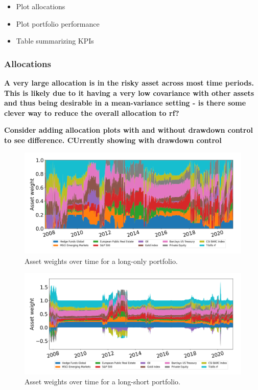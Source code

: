 \begin{itemize}
    \item Plot allocations
    \item Plot portfolio performance
    \item Table summarizing KPIs
\end{itemize}

\subsubsection*{Allocations}

\textbf{A very large allocation is in the risky asset across most time periods. This is likely due to it having a very low covariance with other assets and thus being desirable in a mean-variance setting - is there some clever way to reduce the overall allocation to rf?}

\textbf{Consider adding allocation plots with and without drawdown control to see difference. CUrrently showing with drawdown control}

\begin{figure}[H]
    \centering
    \includegraphics[width=1\textwidth]{analysis/portfolio_exercise/images/mle/weights_lo.png}
    \caption[Asset weights over time for a long-only portfolio]{Asset weights over time for a long-only portfolio.}
    \label{fig:MPC_port_weights_lo}
\end{figure}

\begin{figure}[H]
    \centering
    \includegraphics[width=1\textwidth]{analysis/portfolio_exercise/images/mle/weights_ls.png}
    \caption[Asset weights over time for a long-short portfolio]{Asset weights over time for a long-short portfolio.}
    \label{fig:MPC_port_weights_ls}
\end{figure}

